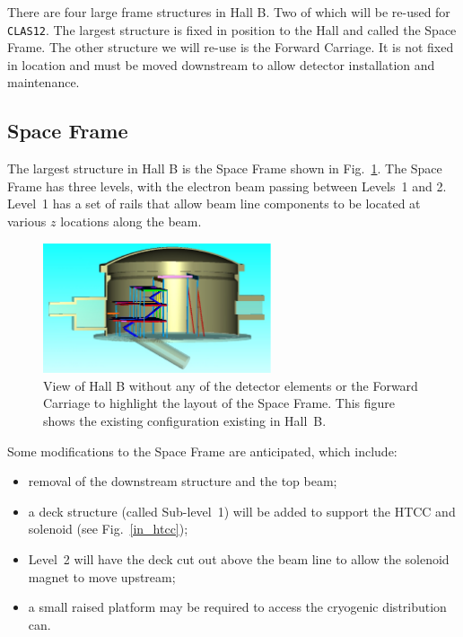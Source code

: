 There are four large frame structures in Hall B. Two of which will be 
re-used for {\tt CLAS12}. The largest structure is fixed in position to 
the Hall and called the Space Frame. The other structure we will re-use 
is the Forward Carriage. It is not fixed in location and must be moved 
downstream to allow detector installation and maintenance. 

\subsection{Space Frame}
\label{sec:in_sf}

The largest structure in Hall B is the Space Frame shown in Fig.~\ref{in_sf}. 
The Space Frame has three levels, with the electron beam passing between 
Levels~1 and 2.  Level~1 has a set of rails that allow beam line components 
to be located at various $z$ locations along the beam. 

\begin{figure}[htbp]
\centering
\includegraphics[width=0.6\textwidth]{fig2spaceframe.eps}
\caption{\small{View of Hall B without any of the detector elements or
the Forward Carriage to highlight the layout of the Space Frame.  This
figure shows the existing configuration existing in Hall~B.}}
\label{in_sf}
\end{figure}

Some modifications to the Space Frame are anticipated, which include:

\begin{itemize}

\item removal of the downstream structure and the top beam;
\item a deck structure (called Sub-level~1) will be added to support the 
      HTCC and solenoid (see Fig.~\ref{in_htcc});
\item Level~2 will have the deck cut out above the beam line to allow the 
      solenoid magnet to move upstream;  
\item a small raised platform may be required to access the cryogenic 
      distribution can. 
\end{itemize}

